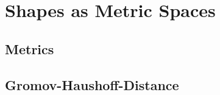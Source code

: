 \chapter{Shapes as Metric Spaces}
\label{chapter:shapeSpaces}

\section{Metrics}
\section{Gromov-Haushoff-Distance}


